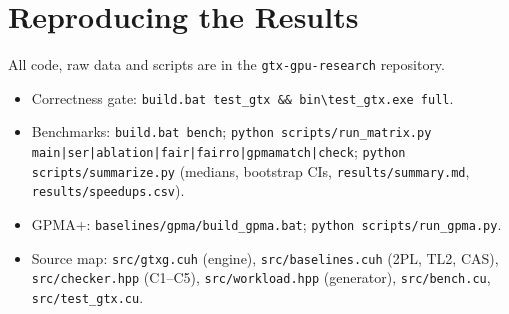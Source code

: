 \documentclass[sigconf,nonacm]{acmart}
\newcommand{\code}[1]{\texttt{#1}}
\begin{document}



\appendix
\section{Reproducing the Results}
All code, raw data and scripts are in the \code{gtx-gpu-research} repository.
\begin{itemize}
\item Correctness gate: \code{build.bat test\_gtx \&\& bin\textbackslash test\_gtx.exe full}.
\item Benchmarks: \code{build.bat bench}; \code{python scripts/run\_matrix.py main|ser|ablation|fair|fairro|gpmamatch|check};
\code{python scripts/summarize.py} (medians, bootstrap CIs, \code{results/summary.md}, \code{results/speedups.csv}).
\item GPMA+: \code{baselines/gpma/build\_gpma.bat}; \code{python scripts/run\_gpma.py}.
\item Source map: \code{src/gtxg.cuh} (engine), \code{src/baselines.cuh} (2PL, TL2, CAS), \code{src/checker.hpp}
(C1--C5), \code{src/workload.hpp} (generator), \code{src/bench.cu}, \code{src/test\_gtx.cu}.
\end{itemize}
\end{document}
